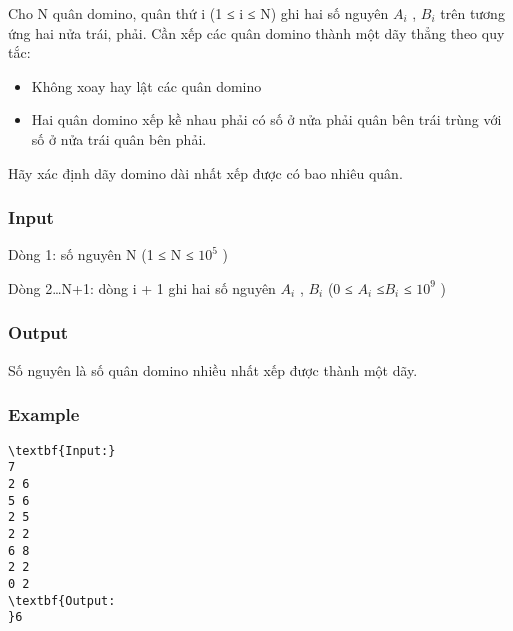 

Cho N quân domino, quân thứ i (1 ≤ i ≤ N) ghi hai số nguyên $A_{­i}$ , $B_{i}$ trên tương ứng hai nửa trái, phải. Cần xếp các quân domino thành một dãy thẳng theo quy tắc:
\begin{itemize}
	\item Không xoay hay lật các quân domino
	\item Hai quân domino xếp kề nhau phải có số ở nửa phải quân bên trái trùng với số ở nửa trái quân bên phải.
\end{itemize}

Hãy xác định dãy domino dài nhất xếp được có bao nhiêu quân.

\subsubsection{Input}

Dòng 1: số nguyên N (1 ≤ N ≤ $10^{5}$ )

Dòng 2…N+1: dòng i + 1 ghi hai số nguyên $A_{i}$ , $B_{i}$ (0 ≤ $A_{i}$ ≤$B_{i}$ ≤ $10^{9}$ )

\subsubsection{Output}

Số nguyên là số quân domino nhiều nhất xếp được thành một dãy.

\subsubsection{Example}
\begin{verbatim}
\textbf{Input:}
7
2 6
5 6
2 5
2 2
6 8
2 2
0 2 
\textbf{Output:
}6\end{verbatim}
